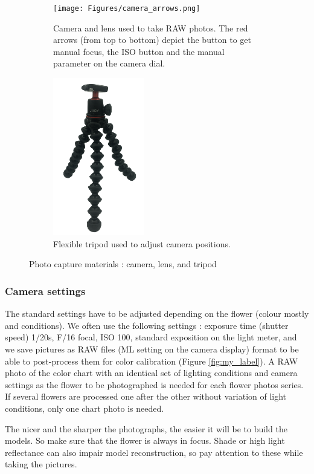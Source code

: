 \documentclass[10pt,letter,english]{article}
\begin{document}
\begin{figure}[H]
\centering
\begin{subfigure}[t]{.5\textwidth}
  \centering
  \texttt{[image: Figures/camera\_arrows.png]}
  \caption{Camera and lens used to take RAW photos. The red arrows (from top to bottom) depict the button to get manual focus, the ISO button and the manual parameter on the camera dial.}
  \label{camera_arrows}
\end{subfigure}%
\begin{subfigure}[t]{.5\textwidth}
  \centering
  \includegraphics[width=4cm]{Figures/tripod.png}
  \caption{Flexible tripod used to adjust camera positions.}
  \label{tripod}
\end{subfigure}
\caption{Photo capture materials : camera, lens, and tripod}
\label{}
\end{figure}




\subsubsection{Camera settings}
The standard settings have to be adjusted depending on the flower (colour mostly and conditions). We often use the following settings : exposure time (shutter speed) 1/20s, F/16 focal, ISO 100, standard exposition on the light meter, and we save pictures as RAW files (ML setting on the camera display) format to be able to post-process them for color calibration (Figure \ref{fig:my_label}). A RAW photo of the color chart with an identical set of lighting conditions and camera settings as the flower to be photographed is needed for each flower photos series. If several flowers are processed one after the other without variation of light conditions, only one chart photo is needed.


\begin{tcolorbox}[width=\linewidth, colback=mygray,title=Tip,colframe=lightgray] %
The nicer and the sharper the photographs, the easier it will be to build the models. So make sure that the flower is always in focus. Shade or high light reflectance can also impair model reconstruction, so pay attention to these while taking the pictures.
\end{tcolorbox}
\end{document}
